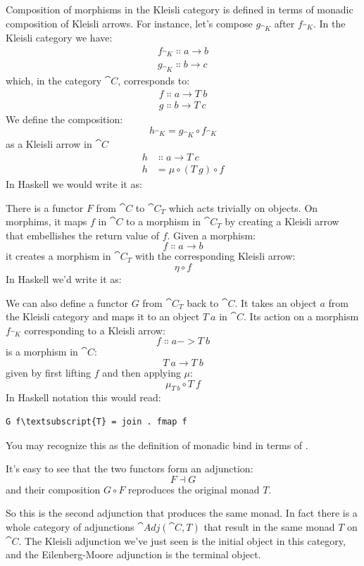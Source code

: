 Composition of morphisms in the Kleisli category is defined in terms of
monadic composition of Kleisli arrows. For instance, let's compose
$g_{\cat{K}}$ after $f_{\cat{K}}$. In the Kleisli category we have:
\begin{gather*}
f_{\cat{K}} \Colon a \to b \\
g_{\cat{K}} \Colon b \to c
\end{gather*}
which, in the category $\cat{C}$, corresponds to:
\begin{gather*}
f \Colon a \to T\ b \\
g \Colon b \to T\ c
\end{gather*}
We define the composition:
\[h_{\cat{K}} = g_{\cat{K}} \circ f_{\cat{K}}\]
as a Kleisli arrow in $\cat{C}$
\begin{align*}
h &\Colon a \to T\ c \\
h &= \mu \circ (T\ g) \circ f
\end{align*}
In Haskell we would write it as:

There is a functor $F$ from $\cat{C}$ to $\cat{C}_T$
which acts trivially on objects. On morphims, it maps $f$ in
$\cat{C}$ to a morphism in $\cat{C}_T$ by creating a
Kleisli arrow that embellishes the return value of $f$. Given a
morphism:
\[f \Colon a \to b\]
it creates a morphism in $\cat{C}_T$ with the
corresponding Kleisli arrow:
\[\eta \circ f\]
In Haskell we'd write it as:

We can also define a functor $G$ from $\cat{C}_T$
back to $\cat{C}$. It takes an object $a$ from the Kleisli
category and maps it to an object $T\ a$ in $\cat{C}$. Its action 
on a morphism $f_{\cat{K}}$ corresponding to a Kleisli arrow:
\[f \Colon a -> T\ b\]
is a morphism in $\cat{C}$:
\[T\ a \to T\ b\]
given by first lifting $f$ and then applying $\mu$:
\[\mu_{T\ b} \circ T\ f\]
In Haskell notation this would read:

\begin{Verbatim}[commandchars=\\\{\}]
G f\textsubscript{T} = join . fmap f
\end{Verbatim}
You may recognize this as the definition of monadic bind in terms of
.

It's easy to see that the two functors form an adjunction:
\[F \dashv G\]
and their composition $G \circ F$ reproduces the original monad $T$.

So this is the second adjunction that produces the same monad. In fact
there is a whole category of adjunctions $\cat{Adj}(\cat{C}, T)$ that result
in the same monad $T$ on $\cat{C}$. The Kleisli adjunction we've
just seen is the initial object in this category, and the
Eilenberg-Moore adjunction is the terminal object.

